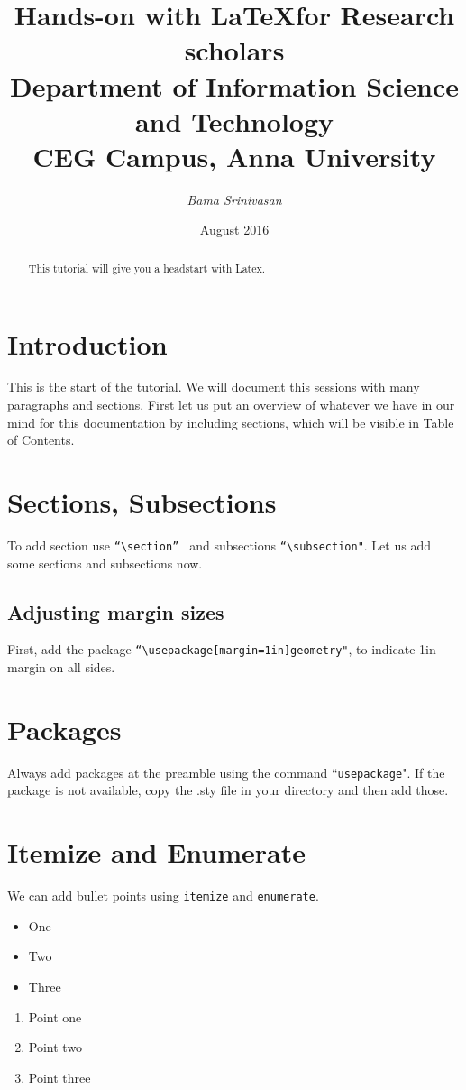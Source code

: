 \documentclass[a4paper,10pt]{article}
\title{\textbf{Hands-on with \LaTeX for  Research scholars \\ Department of Information Science and Technology \\ CEG Campus, Anna University}}
\author{\textit{Bama Srinivasan}}
\date{August 2016}
\begin{document}
\maketitle
\tableofcontents
\newpage
\begin{abstract}
This tutorial will give you a headstart with Latex. 
\end{abstract}
\section{Introduction}
This is the start of the tutorial. We will document this sessions with many paragraphs and sections. First let us put an overview of whatever we have in our mind for this documentation by including sections, which will be visible in Table of Contents. 
\section{Sections, Subsections}
To add section use \texttt{``\textbackslash section'' } and subsections  \texttt{``\textbackslash subsection"}. Let us add some sections and subsections now.
\subsection{Adjusting margin sizes}
First, add the package \texttt{``\textbackslash usepackage[margin=1in]{geometry}"}, to indicate 1in margin on all sides.
\section{Packages}
Always add packages at the preamble using the command ``\texttt{usepackage}". If the package is not available, copy the .sty file in your directory and then add those. 
\section{Itemize and Enumerate}
We can add bullet points using \texttt{itemize} and \texttt{enumerate}.
\begin{itemize}
\item One
\item Two
\item Three
\end{itemize}

\begin{enumerate}
\item Point one
\item Point two
\item Point three
\end{enumerate}
\end{document}
